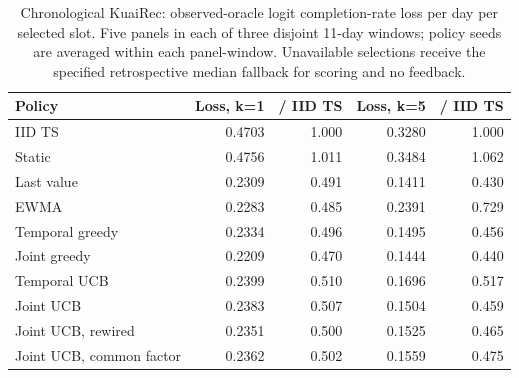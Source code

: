 \begin{table}[!htbp]\centering\small
\begin{lrbox}{\latestTableBox}
\begin{tabular}{lrrrr}
\toprule
Policy & Loss, k=1 & / IID TS & Loss, k=5 & / IID TS \\
\midrule
IID TS & 0.4703 & 1.000 & 0.3280 & 1.000 \\
Static & 0.4756 & 1.011 & 0.3484 & 1.062 \\
Last value & 0.2309 & 0.491 & 0.1411 & 0.430 \\
EWMA & 0.2283 & 0.485 & 0.2391 & 0.729 \\
Temporal greedy & 0.2334 & 0.496 & 0.1495 & 0.456 \\
Joint greedy & 0.2209 & 0.470 & 0.1444 & 0.440 \\
Temporal UCB & 0.2399 & 0.510 & 0.1696 & 0.517 \\
Joint UCB & 0.2383 & 0.507 & 0.1504 & 0.459 \\
Joint UCB, rewired & 0.2351 & 0.500 & 0.1525 & 0.465 \\
Joint UCB, common factor & 0.2362 & 0.502 & 0.1559 & 0.475 \\
\bottomrule
\end{tabular}\end{lrbox}
\ifdim\wd\latestTableBox>\linewidth\resizebox{\linewidth}{!}{\usebox{\latestTableBox}}\else\usebox{\latestTableBox}\fi
\caption{Chronological KuaiRec: observed-oracle logit completion-rate loss per day per selected slot. Five panels in each of three disjoint 11-day windows; policy seeds are averaged within each panel-window. Unavailable selections receive the specified retrospective median fallback for scoring and no feedback.}
\label{tab:latest-daily}
\end{table}
